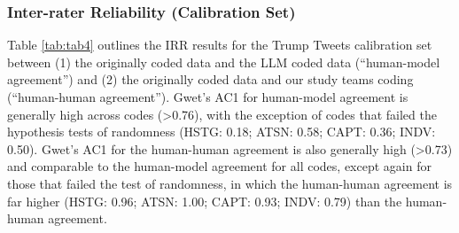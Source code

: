 \documentclass{article}
\begin{document}
\pagebreak
\subsubsection{Inter-rater Reliability (Calibration Set)}
Table \ref{tab:tab4} outlines the IRR results for the Trump Tweets calibration set between (1) the originally coded data and the LLM coded data (“human-model agreement”) and (2) the originally coded data and our study teams coding (“human-human agreement”).  Gwet’s AC1 for human-model agreement is generally high across codes (>0.76), with the exception of codes that failed the hypothesis tests of randomness (HSTG: 0.18; ATSN: 0.58; CAPT: 0.36; INDV: 0.50).  Gwet’s AC1 for the human-human agreement is also generally high (>0.73) and comparable to the human-model agreement for all codes, except again for those that failed the test of randomness, in which the human-human agreement is far higher (HSTG: 0.96; ATSN: 1.00; CAPT: 0.93; INDV: 0.79) than the human-human agreement.  
\end{document}
